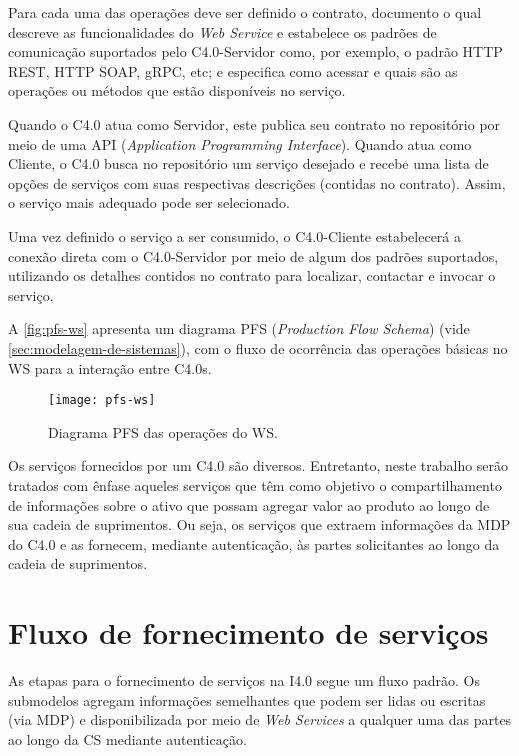 Para cada uma das operações deve ser definido o contrato, documento o qual descreve as funcionalidades do \textit{Web Service} e estabelece os padrões de comunicação suportados pelo C4.0-Servidor como, por exemplo, o padrão HTTP REST, HTTP SOAP, gRPC, etc; e especifica como acessar e quais são as operações ou métodos que estão disponíveis no serviço.

Quando o C4.0 atua como Servidor, este publica seu contrato no repositório por meio de uma API (\textit{Application Programming Interface}). Quando atua como Cliente, o C4.0 busca no repositório um serviço desejado e recebe uma lista de opções de serviços com suas respectivas descrições (contidas no contrato). Assim, o serviço mais adequado pode ser selecionado.

Uma vez definido o serviço a ser consumido, o C4.0-Cliente estabelecerá a conexão direta com o C4.0-Servidor por meio de algum dos padrões suportados, utilizando os detalhes contidos no contrato para localizar, contactar e invocar o serviço.

A \autoref{fig:pfs-ws} apresenta um diagrama PFS (\textit{Production Flow Schema}) (vide \autoref{sec:modelagem-de-sistemas}), com o fluxo de ocorrência das operações básicas no WS para a interação entre C4.0s.

\begin{figure}[htb]
	\centering
	\texttt{[image: pfs-ws]}
	\caption{Diagrama PFS das operações do WS.}
	\label{fig:pfs-ws}
\end{figure}

Os serviços fornecidos por um C4.0 são diversos. Entretanto, neste trabalho serão tratados com ênfase aqueles serviços que têm como objetivo o compartilhamento de informações sobre o ativo que possam agregar valor ao produto ao longo de sua cadeia de suprimentos. Ou seja, os serviços que extraem informações da MDP do C4.0 e as fornecem, mediante autenticação, às partes solicitantes ao longo da cadeia de suprimentos.

\section{Fluxo de fornecimento de serviços}
\label{sec:fluxo-de-fornecimento-de-servicos}

As etapas para o fornecimento de serviços na I4.0 segue um fluxo padrão. Os submodelos agregam informações semelhantes que podem ser lidas ou escritas (via MDP) e disponibilizada por meio de \textit{Web Services} a qualquer uma das partes ao longo da CS mediante autenticação.

